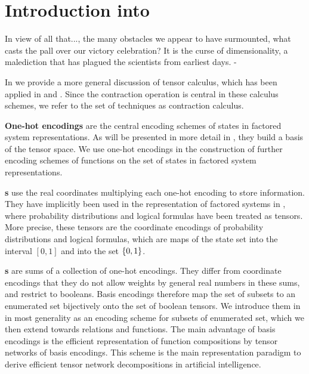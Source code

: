 \chapter{Introduction into }

\begin{highlight}
	In view of all that..., the many obstacles we appear to have surmounted, what casts the pall over our victory celebration?
	It is the curse of dimensionality, a malediction that has plagued the scientists from earliest days. - 
\end{highlight}

In  we provide a more general discussion of tensor calculus, which has been applied in  and .
Since the contraction operation is central in these calculus schemes, we refer to the set of techniques as contraction calculus.


\textbf{One-hot encodings} are the central encoding schemes of states in factored system representations.
As will be presented in more detail in , they build a basis of the tensor space.
We use one-hot encodings in the construction of further encoding schemes of functions on the set of states in factored system representations.

\textbf{\CoordinateEncoding{}s} use the real coordinates multiplying each one-hot encoding to store information.
They have implicitly been used in the representation of factored systems in , where probability distributions and logical formulas have been treated as tensors.
More precise, these tensors are the coordinate encodings of probability distributions and logical formulas, which are maps of the state set into the interval $[0,1]$ and into the set $\{0,1\}$.

\textbf{\BasisEncoding{}s} are sums of a collection of one-hot encodings.
They differ from coordinate encodings that they do not allow weights by general real numbers in these sums, and restrict to booleans.
Basis encodings therefore map the set of subsets to an enumerated set bijectively onto the set of boolean tensors.
We introduce them in  in most generality as an encoding scheme for subsets of enumerated set, which we then extend towards relations and functions.
The main advantage of basis encodings is the efficient representation of function compositions by tensor networks of basis encodings.
This scheme is the main representation paradigm to derive efficient tensor network decompositions in artificial intelligence.

